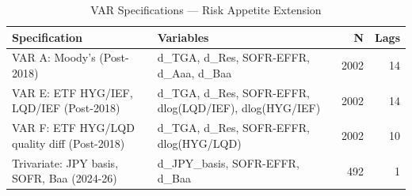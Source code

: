 \begin{table}[htbp]
\centering
\caption{VAR Specifications --- Risk Appetite Extension} 
\label{tab:var_extension}
\begin{tabular}{llrr}
  \toprule
Specification & Variables & N & Lags \\ 
  \midrule
VAR A: Moody's (Post-2018) & d\_TGA, d\_Res, SOFR-EFFR, d\_Aaa, d\_Baa & 2002 & 14 \\ 
  VAR E: ETF HYG/IEF, LQD/IEF (Post-2018) & d\_TGA, d\_Res, SOFR-EFFR, dlog(LQD/IEF), dlog(HYG/IEF) & 2002 & 14 \\ 
  VAR F: ETF HYG/LQD quality diff (Post-2018) & d\_TGA, d\_Res, SOFR-EFFR, dlog(HYG/LQD) & 2002 & 10 \\ 
  Trivariate: JPY basis, SOFR, Baa (2024-26) & d\_JPY\_basis, SOFR-EFFR, d\_Baa & 492 & 1 \\ 
   \bottomrule
\end{tabular}
\end{table}
